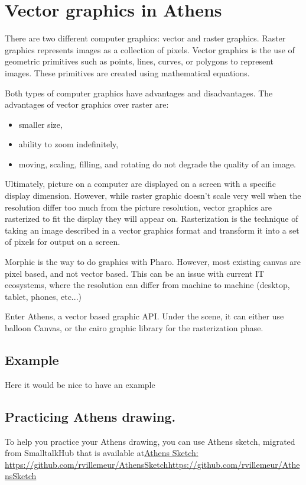 \documentclass[10pt,twoside,english]{_support/latex/sbabook/sbabook}
\begin{document}
\frontmatter
\pagestyle{plain}

\tableofcontents*
\clearpage\listoffigures

\mainmatter


\chapter{Vector graphics in Athens}
There are two different computer graphics: vector and raster graphics.
Raster graphics represents images as a collection of pixels. Vector graphics
is the use of geometric primitives such as points, lines, curves, or polygons
to represent images. These primitives are created using mathematical equations.

Both types of computer graphics have advantages and disadvantages.
The advantages of vector graphics over raster are:

\begin{itemize}
    \item smaller size,
    \item ability to zoom indefinitely,
    \item moving, scaling, filling, and rotating do not degrade the quality of an image.
\end{itemize}

Ultimately, picture on a computer are displayed on a screen with a specific
display dimension. However, while raster graphic doesn't scale very well when
the resolution differ too much from the picture resolution, vector graphics
are rasterized to fit the display they will appear on. Rasterization is the
technique of taking an image described in a vector graphics format and
transform it into a set of pixels for output on a screen.

Morphic is the way to do graphics with Pharo.
However, most existing canvas are pixel based, and not vector based.
This can be an issue with current IT ecosystems, where the resolution can differ from machine to machine (desktop, tablet, phones, etc...)

Enter Athens, a vector based graphic API. Under the scene, it can either use
balloon Canvas, or the cairo graphic library for the rasterization phase.

\section{Example}
Here it would be nice to have an example

\section{Practicing Athens drawing.}
To help you practice your Athens drawing, you can use Athens sketch, migrated from SmalltalkHub that is available at\href{https://github.com/rvillemeur/AthensSketch}{Athens Sketch: https://github.com/rvillemeur/AthensSketch}\footnotesize{\url{https://github.com/rvillemeur/AthensSketch}}
\end{document}
